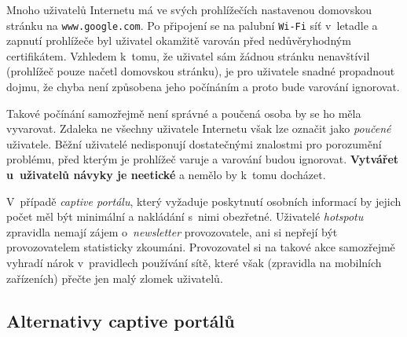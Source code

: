 \documentclass[thesis=M,czech]{FITthesis}[2012/10/20]
\begin{document}
Mnoho uživatelů Internetu má ve svých prohlížečích nastavenou domovskou stránku na \texttt{www.google.com}. Po připojení se na palubní \texttt{Wi-Fi} síť v~letadle a zapnutí prohlížeče byl uživatel okamžitě varován před nedůvěryhodným certifikátem. Vzhledem k~tomu, že uživatel sám žádnou stránku nenavštívil (prohlížeč pouze načetl domovskou stránku), je pro uživatele snadné propadnout dojmu, že chyba není způsobena jeho počínáním a proto bude varování ignorovat.

Takové počínání samozřejmě není správné a poučená osoba by se ho měla vyvarovat. Zdaleka ne všechny uživatele Internetu však lze označit jako \textit{poučené} uživatele. Běžní uživatelé nedisponují dostatečnými znalostmi pro porozumění problému, před kterým je prohlížeč varuje a varování budou ignorovat. \textbf{Vytvářet u~uživatelů návyky  je neetické} a nemělo by k~tomu docházet.

V~případě \textit{captive portálu}, který vyžaduje poskytnutí osobních informací by jejich počet měl být minimální a nakládání s~nimi obezřetné. Uživatelé \textit{hotspotu} zpravidla nemají zájem o~\textit{newsletter} provozovatele, ani si nepřejí být provozovatelem statisticky zkoumáni. Provozovatel si na takové akce samozřejmě vyhradí nárok v~pravidlech používání sítě, které však (zpravidla na mobilních zařízeních) přečte jen malý zlomek uživatelů.

%

\subsection{Alternativy captive portálů}
\end{document}
